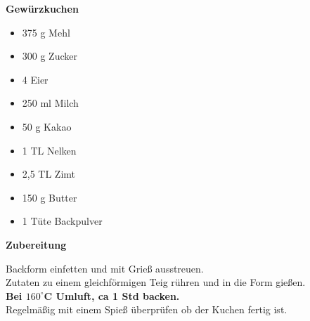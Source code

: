 
\parindent0pt	

\pagestyle{empty}


\textbf{{\LARGE Gewürzkuchen}}%


\hrulefill
\vspace*{\fill}
\begin{multicols}{2}	


\begin{itemize}
\item 375 g Mehl
\item 300 g Zucker
\item 4 Eier
\item 250 ml Milch
\item 50 g Kakao
\item 1 TL Nelken
\item 2,5 TL Zimt
\item 150 g Butter
\item 1 Tüte Backpulver
\end{itemize}

\end{multicols}
\vfill
\newpage
\textbf{{\LARGE Zubereitung}}%

\hrulefill

\vspace*{\fill}
\begin{multicols}{2}


Backform einfetten und mit Grieß ausstreuen.\\

Zutaten zu einem gleichförmigen Teig rühren und in die Form gießen.\\

\textbf{Bei $160^\circ$C Umluft, ca 1 Std backen.}\\

Regelmäßig mit einem Spieß überprüfen ob der Kuchen fertig ist.




\end{multicols}
\vfill
